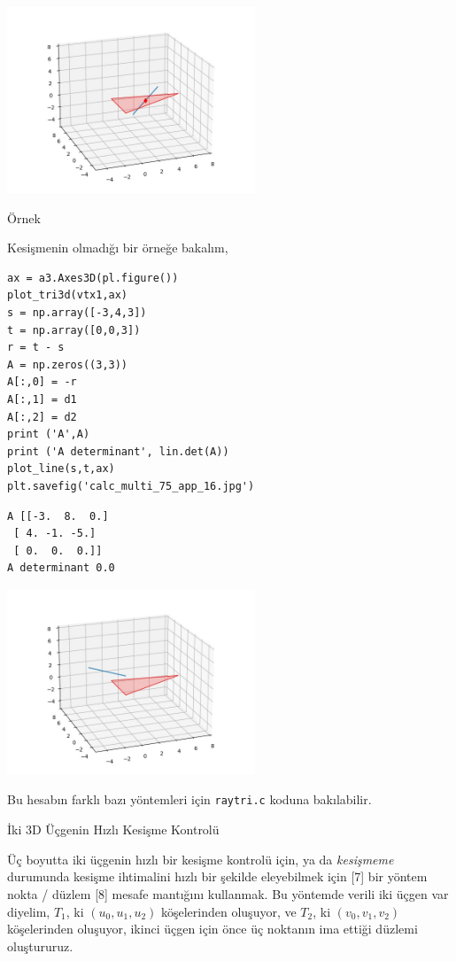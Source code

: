\documentclass[12pt,fleqn]{article}\usepackage{../../common}
\begin{document}
\includegraphics[width=20em]{calc_multi_75_app_15.jpg}

Örnek

Kesişmenin olmadığı bir örneğe bakalım,

\begin{verbatim}
ax = a3.Axes3D(pl.figure())
plot_tri3d(vtx1,ax)
s = np.array([-3,4,3])
t = np.array([0,0,3])
r = t - s
A = np.zeros((3,3))
A[:,0] = -r
A[:,1] = d1
A[:,2] = d2
print ('A',A)
print ('A determinant', lin.det(A))
plot_line(s,t,ax)
plt.savefig('calc_multi_75_app_16.jpg')
\end{verbatim}

\begin{verbatim}
A [[-3.  8.  0.]
 [ 4. -1. -5.]
 [ 0.  0.  0.]]
A determinant 0.0
\end{verbatim}

\includegraphics[width=20em]{calc_multi_75_app_16.jpg}

Bu hesabın farklı bazı yöntemleri için \verb!raytri.c! koduna bakılabilir.

İki 3D Üçgenin Hızlı Kesişme Kontrolü

Üç boyutta iki üçgenin hızlı bir kesişme kontrolü için, ya da {\em kesişmeme}
durumunda kesişme ihtimalini hızlı bir şekilde eleyebilmek için [7] bir yöntem
nokta / düzlem [8] mesafe mantığını kullanmak. Bu yöntemde verili iki üçgen var
diyelim, $T_1$, ki $(u_0,u_1,u_2)$ köşelerinden oluşuyor, ve $T_2$, ki
$(v_0,v_1,v_2)$ köşelerinden oluşuyor, ikinci üçgen için önce üç noktanın ima
ettiği düzlemi oluştururuz.
\end{document}
